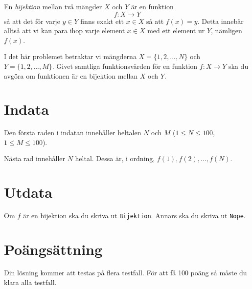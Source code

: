 
En \emph{bijektion} mellan två mängder $X$ och $Y$ är en funktion $$f : X \rightarrow Y$$ så att det för varje $y \in Y$ finns exakt ett $x \in X$ så att $f(x) = y$. Detta innebär alltså att vi kan para ihop varje element $x \in X$ med ett element ur $Y$, nämligen $f(x)$.

I det här problemet betraktar vi mängderna $X = \{1, 2, ..., N\}$ och $Y = \{1, 2, ..., M\}$. Givet samtliga funktionsvärden för en funktion $f : X \rightarrow Y$ ska du avgöra om funktionen är en bijektion mellan $X$ och $Y$.

\section*{Indata}
Den första raden i indatan innehåller heltalen $N$ och $M$ ($1 \le N \le 100$, $1 \le M \le 100$).

Nästa rad innehåller $N$ heltal. Dessa är, i ordning, $f(1), f(2), ..., f(N)$.

\section*{Utdata}
Om $f$ är en bijektion ska du skriva ut \texttt{Bijektion}. Annars ska du skriva ut \texttt{Nope}.

\section*{Poängsättning}
Din lösning kommer att testas på flera testfall. För att få 100 poäng så måste du klara alla testfall.
